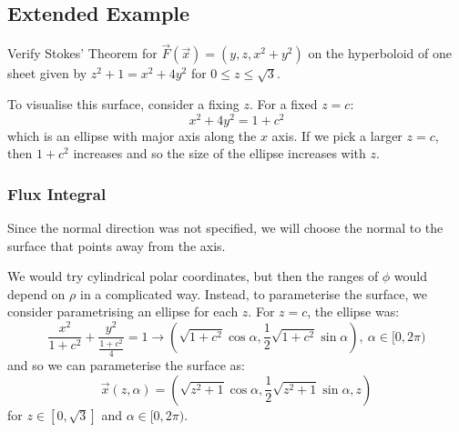 \documentclass[../main.tex]{subfiles}
\begin{document}
\subsection{Extended Example}
\begin{remark}[Question]
  Verify Stokes' Theorem for $\vec{F}(\vec{x}) = (y, z, x^2 + y^2)$ on the hyperboloid of one sheet given by $z^2 + 1 = x^2 + 4y^2$ for $0 \leq z \leq \sqrt{3}$.
\end{remark}
To visualise this surface, consider a fixing $z$.
For a fixed $z = c$:
\[
  x^2 + 4y^2 = 1 + c^2
\]
which is an ellipse with major axis along the $x$ axis.
If we pick a larger $z = c$, then $1 + c^2$ increases and so the size of the ellipse increases with $z$.
\begin{center}
\end{center}
\subsubsection{Flux Integral}
Since the normal direction was not specified, we will choose the normal to the surface that points away from the axis.

We would try cylindrical polar coordinates, but then the ranges of $\phi$ would depend on $\rho$ in a complicated way.
Instead, to parameterise the surface, we consider parametrising an ellipse for each $z$.
For $z = c$, the ellipse was:
\[
  \frac{x^2}{1 + c^2} + \frac{y^2}{\frac{1 + c^2}{4}} = 1 \to \left(\sqrt{1 + c^2}\cos \alpha, \frac{1}{2}\sqrt{1 + c^2} \sin \alpha\right),\ \alpha \in [0, 2\pi)
\]
and so we can parameterise the surface as:
\[
  \vec{x}(z, \alpha) = \left(\sqrt{z^2 + 1}\cos \alpha, \frac{1}{2}\sqrt{z^2 + 1} \sin \alpha, z\right)
\]
for $z \in [0, \sqrt{3}]$ and $\alpha \in [0, 2\pi)$.
\end{document}

